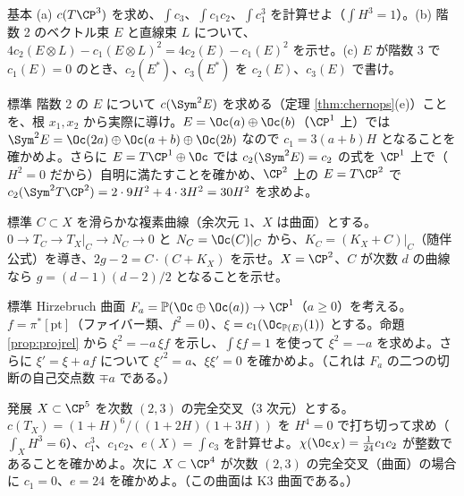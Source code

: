 \begin{prob}{基本}\label{p:chernbasic}
(a) $c(T\CP^3)$ を求め、$\int c_3$、$\int c_1c_2$、$\int c_1^3$ を計算せよ（$\int H^3=1$）。(b) 階数 2 のベクトル束 $E$ と直線束 $L$ について、$4c_2(E\otimes L)-c_1(E\otimes L)^2=4c_2(E)-c_1(E)^2$ を示せ。(c) $E$ が階数 3 で $c_1(E)=0$ のとき、$c_2(E^*)$、$c_3(E^*)$ を $c_2(E)$、$c_3(E)$ で書け。
\end{prob}
\begin{prob}{標準}\label{p:chernsym}
階数 2 の $E$ について $c(\Sym^2E)$ を求める（定理 \ref{thm:chernops}(e)）ことを、根 $x_1,x_2$ から実際に導け。$E=\Oc(a)\oplus\Oc(b)$（$\CP^1$ 上）では $\Sym^2E=\Oc(2a)\oplus\Oc(a+b)\oplus\Oc(2b)$ なので $c_1=3(a+b)H$ となることを確かめよ。さらに $E=T\CP^1\oplus\Oc$ では $c_2(\Sym^2E)=c_2$ の式を $\CP^1$ 上で（$H^2=0$ だから）自明に満たすことを確かめ、$\CP^2$ 上の $E=T\CP^2$ で $c_2(\Sym^2T\CP^2)=2\cdot9H^2+4\cdot3H^2=30H^2$ を求めよ。
\end{prob}
\begin{prob}{標準}\label{p:adjunction}
$C\subset X$ を滑らかな複素曲線（余次元 $1$、$X$ は曲面）とする。$0\to T_C\to T_X|_C\to N_C\to0$ と $N_C=\Oc(C)|_C$ から、$K_C=(K_X+C)|_C$（随伴公式）を導き、$2g-2=C\cdot(C+K_X)$ を示せ。$X=\CP^2$、$C$ が次数 $d$ の曲線なら $g=(d-1)(d-2)/2$ となることを示せ。
\end{prob}
\begin{prob}{標準}\label{p:Fa}
Hirzebruch 曲面 $F_a=\mathbb P(\Oc\oplus\Oc(a))\to\CP^1$（$a\ge0$）を考える。$f=\pi^*[\mathrm{pt}]$（ファイバー類、$f^2=0$）、$\xi=c_1(\Oc_{\mathbb P(E)}(1))$ とする。命題 \ref{prop:projrel} から $\xi^2=-a\,\xi f$ を示し、$\int\xi f=1$ を使って $\xi^2=-a$ を求めよ。さらに $\xi'=\xi+af$ について $\xi'^2=a$、$\xi\xi'=0$ を確かめよ。（これは $F_a$ の二つの切断の自己交点数 $\mp a$ である。）
\end{prob}
\begin{prob}{発展}\label{p:hyperCI}
$X\subset\CP^5$ を次数 $(2,3)$ の完全交叉（3 次元）とする。$c(T_X)=(1+H)^6/((1+2H)(1+3H))$ を $H^4=0$ で打ち切って求め（$\int_XH^3=6$）、$c_1^3$、$c_1c_2$、$e(X)=\int c_3$ を計算せよ。$\chi(\Oc_X)=\frac1{24}c_1c_2$ が整数であることを確かめよ。次に $X\subset\CP^4$ が次数 $(2,3)$ の完全交叉（曲面）の場合に $c_1=0$、$e=24$ を確かめよ。（この曲面は K3 曲面である。）
\end{prob}
